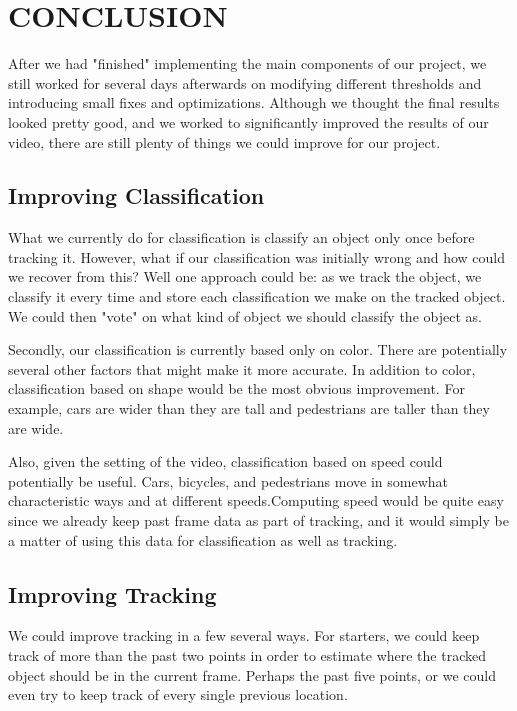 \documentclass[a4paper, 10pt, conference]{ieeeconf}      %
\begin{document}
\section{CONCLUSION}

After we had "finished" implementing the main components of our project, we still worked for several days afterwards on modifying different thresholds and introducing small fixes and optimizations. Although we thought the final results looked pretty good, and we worked to significantly improved the results of our video, there are still plenty of things we could improve for our project. \newline


\subsection{Improving Classification}
What we currently do for classification is classify an object only once before tracking it. However, what if our classification was initially wrong and how could we recover from this? Well one approach could be: as we track the object, we classify it every time and store each classification we make on the tracked object. We could then "vote" on what kind of object we should classify the object as. \newline

Secondly, our classification is currently based only on color. There are potentially several other factors that might make it more accurate. In addition to color, classification based on shape would be the most obvious improvement. For example, cars are wider than they are tall and pedestrians are taller than they are wide. \newline

Also, given the setting of the video, classification based on speed could potentially be useful. Cars, bicycles, and pedestrians move in somewhat characteristic ways and at different speeds.Computing speed would be quite easy since we already keep past frame data as part of tracking, and it would simply be a matter of using this data for classification as well as tracking. \newline


\subsection{Improving Tracking}
We could improve tracking in a few several ways. For starters, we could keep track of more than the past two points in order to estimate where the tracked object should be in the current frame. Perhaps the past five points, or we could even try to keep track of every single previous location. \newline
\end{document}
